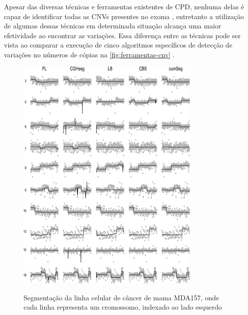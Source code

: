 Apesar das diversas técnicas e ferramentas existentes de CPD, nenhuma delas é capaz de identificar todas as CNVs presentes no exoma \cite{Zhao2013}, entretanto a utilização de algumas dessas técnicas em determinada situação alcança uma maior efetividade ao encontrar as variações. Essa diferença entre as técnicas pode ser vista ao comparar a execução de cinco algoritmos específicos de detecção de variações no números de cópias na \autoref{fig:ferramentas-cnv} \cite{Muggeo2010}.

\begin{figure}[!htb]
    \centering
    \caption{Segmentação da linha celular de câncer de mama MDA157, onde cada linha representa um cromossomo, indexado ao lado esquerdo}
    \includegraphics[width=0.8\textwidth]{./dados/figuras/ferramentas-cnv}
    \label{fig:ferramentas-cnv}
\end{figure}





